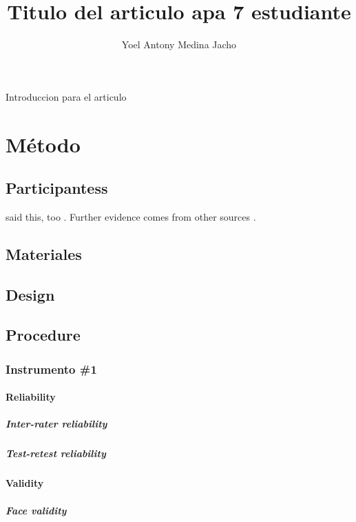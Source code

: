 \documentclass[stu]{apaV7}
\title{Titulo del articulo apa 7 estudiante}
\author{Yoel Antony Medina Jacho}
\affiliation{Universidad Nacional de San Agustin}
\begin{document}
	
	\maketitle
	
	
	Introduccion para el articulo \lipsum[2]
	\section{M\'etodo}
	\subsection{Participantess}
	\lipsum[4]
	
	\Textcite{vonDavier2011} said this,
	too \parencite{vonDavier2011,Lassen2006}.  Further evidence comes from
	other sources \parencite{Shotton1989,Lassen2006}.  \lipsum[3]
	
	\subsection{Materiales}
	\lipsum[5]
	
	\subsection{Design}
	\lipsum[6]
	
	\subsection{Procedure}
	\lipsum[7]
	
	\subsubsection{Instrumento \#1}
	\lipsum[8]
	
	\paragraph{Reliability}
	\lipsum[9]
	
	\subparagraph{Inter-rater reliability}
	\lipsum[10]
	
	\subparagraph{Test-retest reliability}
	\lipsum[11]
	
	\paragraph{Validity}
	\lipsum[12]
	
	\subparagraph{Face validity}
	\lipsum[13]
	
\end{document}
